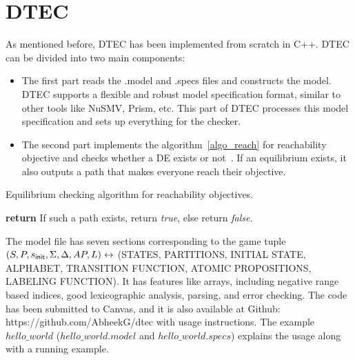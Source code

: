 \documentclass[format=acmsmall, review=false]{acmart}
\begin{document}
\section{DTEC}

As mentioned before, DTEC has been implemented from scratch in C++. DTEC can be divided into two main components:
\begin{itemize}
  \item The first part reads the .model and .specs files and constructs the model. DTEC supports a flexible and robust model specification format, similar to other tools like NuSMV, Prism, etc. This part of DTEC processes this model specification and sets up everything for the checker.
  \item The second part implements the algorithm~\ref{algo_reach} for reachability objective and checks whether a DE exists or not~\cite{chatterjee2014doomsday}. If an equilibrium exists, it also outputs a path that makes everyone reach their objective.
\end{itemize}

\begin{algorithm}
\caption{Equilibrium checking algorithm for reachability objectives.}\label{algo_reach}
\begin{algorithmic}[1]
\State \textbf{return} If such a path exists, return \textit{true}, else return \textit{false}.
\end{algorithmic}
\end{algorithm}

The model file has seven sections corresponding to the game tuple $(S, P, s_{{\sf init}}, \Sigma, \Delta, AP, L) \leftrightarrow $ (STATES, PARTITIONS, INITIAL STATE, ALPHABET, TRANSITION FUNCTION, ATOMIC PROPOSITIONS, LABELING FUNCTION). It has features like arrays, including negative range based indices, good lexicographic analysis, parsing, and error checking. The code has been submitted to Canvas, and it is also available at Github: https://github.com/AbheekG/dtec with usage instructions. The example $hello\_world$ ($hello\_world.model$ and $hello\_world.specs$) explains the usage along with a running example.
\end{document}
